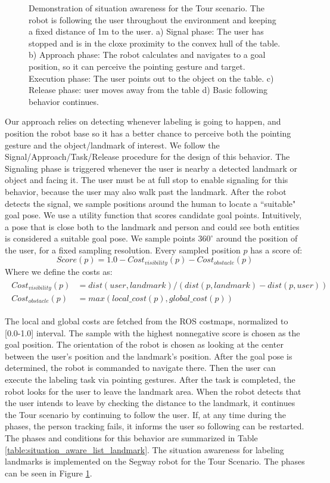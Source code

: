 \begin{figure}[ht!]
{        }
    \caption{Demonstration of situation awareness for the Tour scenario. The robot is following the user throughout the environment and keeping a fixed distance of 1m to the user. a) Signal phase: The user has stopped and is in the cloxe proximity to the convex hull of the table. b) Approach phase: The robot calculates and navigates to a goal position, so it can perceive the pointing gesture and target. Execution phase: The user points out to the object on the table. c) Release phase: user moves away from the table d) Basic following behavior continues.}
   \label{fig:situtation_aware_landmark_labeling}
\end{figure}

Our approach relies on detecting whenever labeling is going to happen, and position the robot base so it has a better chance to perceive both the pointing gesture and the object/landmark of interest. We follow the Signal/Approach/Task/Release procedure for the design of this behavior. The Signaling phase is triggered whenever the user is nearby a detected landmark or object and facing it. The user must be at full stop to enable signaling for this behavior, because the user may also walk past the landmark. After the robot detects the signal, we sample positions around the human to locate a ``suitable" goal pose. We use a utility function that scores candidate goal points. Intuitively, a pose that is close both to the landmark and person and could see both entities is considered a suitable goal pose. We sample points $360^{\circ}$ around the position of the user, for a fixed sampling resolution. Every sampled position $p$ has a score of:
\[
Score(p) = 1.0 - Cost_{visibility}(p) - Cost_{obstacle}(p)
\]
Where we define the costs as:
\begin{align} 
\begin{split} 
Cost_{visibility}(p)&=dist(user,landmark)/(dist(p,landmark)-dist(p,user)) \\
Cost_{obstacle}(p)&=max( local\_cost(p),global\_cost(p))
\end{split} 
\end{align}



The local and global costs are fetched from the ROS costmaps, normalized to [0.0-1.0] interval. The sample with the highest nonnegative score is chosen as the goal position. The orientation of the robot is chosen as looking at the center between the user's position and the landmark's position. After the goal pose is determined, the robot is commanded to navigate there. Then the user can execute the labeling task via pointing gestures. After the task is completed, the robot looks for the user to leave the landmark area. When the robot detects that the user intends to leave by checking the distance to the landmark, it continues the Tour scenario by continuing to follow the user. If, at any time during the phases, the person tracking fails, it informs the user so following can be restarted. The phases and conditions for this behavior are summarized in Table \ref{table:situation_aware_list_landmark}. The situation awareness for labeling landmarks is implemented on the Segway robot for the Tour Scenario. The phases can be seen in Figure \ref{fig:situtation_aware_landmark_labeling}.

